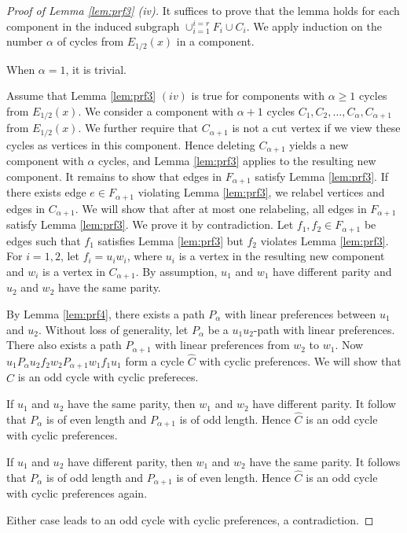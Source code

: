 \documentclass[11pt]{article}
\numberwithin{theorem}{section}
\begin{document}
\begin{proof}[Proof of Lemma \ref{lem:prf3} \emph{(}iv\emph{)}]
It suffices to prove that the lemma holds for each component in the induced subgraph $\cup_{i=1}^{i=r} F_i\cup C_i$. We apply induction on the number $\alpha$ of cycles from $E_{1/2}(x)$ in a component.

When $\alpha=1$, it is trivial.

Assume that Lemma \ref{lem:prf3} $(iv)$ is true for components with $\alpha\geq 1$ cycles from $E_{1/2}(x)$. We consider a component with $\alpha +1$ cycles $C_1, C_2, \ldots, C_{\alpha}, C_{\alpha+1}$ from $E_{1/2}(x)$. We further require that $C_{\alpha+1}$ is not a cut vertex if we view these cycles as vertices in this component.
Hence deleting $C_{\alpha+1}$ yields a new component with $\alpha$ cycles, and Lemma \ref{lem:prf3} applies to the resulting new component. It remains to show that edges in $F_{\alpha+1}$ satisfy Lemma \ref{lem:prf3}. If there exists edge $e\in F_{\alpha+1}$ violating Lemma \ref{lem:prf3}, we relabel vertices and edges in $C_{\alpha+1}$. We will show that after at most one relabeling, all edges in $F_{\alpha+1}$ satisfy Lemma \ref{lem:prf3}. We prove it by contradiction. Let $f_1,f_2 \in F_{\alpha +1}$ be edges such that $f_1$ satisfies Lemma \ref{lem:prf3} but $f_2$ violates Lemma \ref{lem:prf3}. For $i=1,2$, let $f_i=u_i w_i$, where $u_i$ is a vertex in the resulting new component and $w_i$ is a vertex in $C_{\alpha+1}$. By assumption, $u_1$ and $w_1$ have different parity and $u_2$ and $w_2$ have the same parity.

By Lemma \ref{lem:prf4}, there exists a path $P_\alpha$ with linear preferences between $u_1$ and $u_2$. Without loss of generality, let $P_\alpha$ be a $u_1 u_2$-path with linear preferences. There also exists a path $P_{\alpha+1}$ with linear preferences from $w_2$ to $w_1$. Now $u_1 P_\alpha u_2 f_2 w_2 P_{\alpha+1} w_1 f_1 u_1$ form a cycle $\hat{C}$ with cyclic preferences. We will show that $\hat{C}$ is an odd cycle with cyclic prefereces. 

If $u_1$ and $u_2$ have the same parity, then $w_1$ and $w_2$ have different parity. It follow that $P_\alpha$ is of even length and $P_{\alpha+1}$ is of odd length. Hence $\hat{C}$ is an odd cycle with cyclic preferences.

If $u_1$ and $u_2$ have different parity, then $w_1$ and $w_2$ have the same parity. It follows that $P_\alpha$  is of odd length and $P_{\alpha+1}$ is of even length. Hence $\hat{C}$ is an odd cycle with cyclic preferences again.

Either case leads to an odd cycle with cyclic preferences, a contradiction.
\end{proof}
\end{document}
